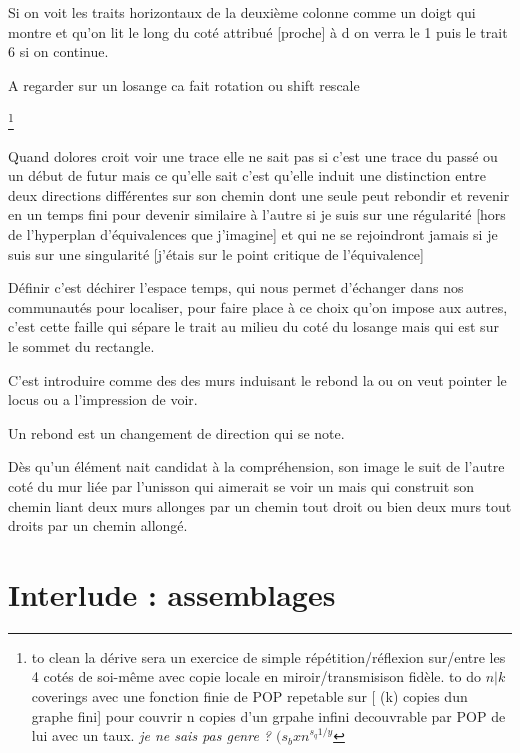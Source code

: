 \documentclass{article}
\begin{document}
Si on voit les traits horizontaux de la deuxième colonne comme un doigt qui montre et qu'on lit le long du coté attribué [proche] à d
on verra le 1 puis le trait 6 si on continue.


A regarder sur un losange ca fait rotation ou shift rescale


\footnote{to clean  la dérive sera un exercice de simple répétition/réflexion sur/entre les 4 cotés de soi-même avec copie locale en miroir/transmisison fidèle. 
to do $n|k$ coverings avec  une fonction finie de POP repetable sur [ (k) copies dun graphe fini]  pour couvrir  n copies d'un grpahe infini decouvrable par POP de lui avec  un taux.\emph{ je ne sais pas genre ? $(s_b x n^{s_q 1/y}$ }}


Quand dolores croit voir une trace elle ne sait pas si c'est une trace du passé ou un début de futur mais ce qu'elle sait c'est qu'elle induit une distinction entre deux directions différentes sur son chemin dont une seule peut rebondir et revenir en un temps fini pour devenir similaire à l'autre si je suis sur une régularité [hors de l'hyperplan d'équivalences que j'imagine] et qui ne se rejoindront jamais si je suis sur une singularité [j'étais sur le point critique de l'équivalence] 

Définir c'est déchirer l'espace temps, qui nous permet d'échanger dans nos  communautés  pour localiser, pour faire place à ce choix qu'on impose aux autres, c'est cette faille qui sépare le trait au milieu du coté du losange mais qui  est sur le sommet du rectangle. 

C'est introduire comme des des murs induisant le rebond la ou on veut pointer le locus ou a l'impression de voir.

Un rebond est un changement de direction qui se note.  

Dès qu'un élément nait candidat à la compréhension, son image le suit de l'autre coté du mur liée par l'unisson qui  aimerait se  voir un mais qui construit son chemin liant deux murs allonges par un chemin tout droit ou bien deux murs tout droits par un chemin allongé.

\section{Interlude : assemblages}



 
 
\end{document}
